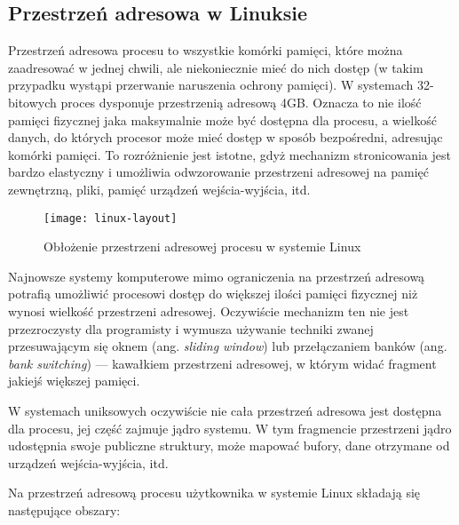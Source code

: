 \documentclass[12pt,a4paper,titlepage,twoside]{mwart}
\begin{document}
\subsection{Przestrzeń adresowa w Linuksie}

Przestrzeń adresowa procesu to wszystkie komórki pamięci, które można
zaadresować w jednej chwili, ale niekoniecznie mieć do nich dostęp (w takim
przypadku wystąpi przerwanie naruszenia ochrony pamięci). W systemach
32-bitowych proces dysponuje przestrzenią adresową 4GB. Oznacza to nie ilość
pamięci fizycznej jaka maksymalnie może być dostępna dla procesu, a wielkość
danych, do których procesor może mieć dostęp w sposób bezpośredni, adresując
komórki pamięci. To rozróżnienie jest istotne, gdyż mechanizm stronicowania
jest bardzo elastyczny i umożliwia odwzorowanie przestrzeni adresowej na pamięć
zewnętrzną, pliki, pamięć urządzeń wejścia-wyjścia, itd.

\begin{figure}[ht]
\centering
\texttt{[image: linux-layout]}
\caption{Obłożenie przestrzeni adresowej procesu w systemie Linux}
\end{figure}

Najnowsze systemy komputerowe mimo ograniczenia na przestrzeń adresową potrafią
umożliwić procesowi dostęp do większej ilości pamięci fizycznej niż wynosi
wielkość przestrzeni adresowej. Oczywiście mechanizm ten nie jest przezroczysty
dla programisty i wymusza używanie techniki zwanej przesuwającym się oknem
(ang. \textit{sliding window}) lub przełączaniem banków (ang. \textit{bank
switching}) --- kawałkiem przestrzeni adresowej, w którym widać fragment jakiejś
większej pamięci.

W systemach uniksowych oczywiście nie cała przestrzeń adresowa jest dostępna
dla procesu, jej część zajmuje jądro systemu. W tym fragmencie przestrzeni
jądro udostępnia swoje publiczne struktury, może mapować bufory, dane otrzymane
od urządzeń wejścia-wyjścia, itd.

Na przestrzeń adresową procesu użytkownika w systemie Linux składają się
następujące obszary:
\end{document}
